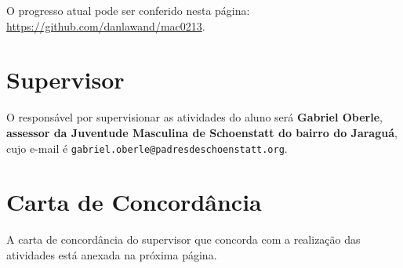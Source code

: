\documentclass{article}
\begin{document}
O progresso atual pode ser conferido nesta página: \url{https://github.com/danlawand/mac0213}.

\section{Supervisor}

O responsável por supervisionar as atividades do aluno  será \textbf{Gabriel Oberle}, \textbf{assessor da Juventude Masculina de Schoenstatt do bairro do Jaraguá}, cujo e-mail é \texttt{gabriel.oberle@padresdeschoenstatt.org}.

\section{Carta de Concordância}

A carta de concordância do supervisor que concorda com a realização das atividades está anexada na próxima página.


\end{document}
